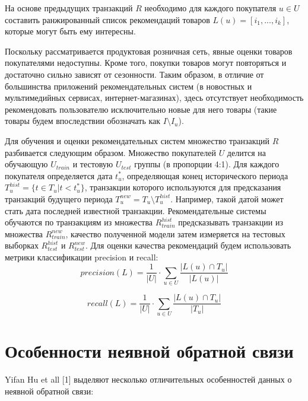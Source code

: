 \documentclass{article}
\begin{document}
На основе предыдущих транзакций $R$ необходимо для каждого покупателя $u \in U$ составить ранжированный список рекомендаций товаров $L(u) = [i_1, ..., i_k]$, которые могут быть ему интересны. \par
Поскольку рассматривается продуктовая розничная сеть, явные оценки товаров покупателями недоступны.
Кроме того, покупки товаров могут повторяться и достаточно сильно зависят от сезонности. Таким образом, в отличие от большинства приложений рекомендательных систем (в новостных и мультимедийных сервисах, интернет-магазинах), здесь отсутствует необходимость рекомендовать пользователю исключительно новые для него товары (такие товары будем впоследствии обозначать как $I \setminus I_u $).  \par
Для обучения и оценки рекомендательных систем множество транзакций $R$ разбивается следующим образом. Множество покупателей $U$ делится на обучающую $U_{train}$ и тестовую $U_{test}$ группы  (в пропорции 4:1). Для каждого покупателя определяется дата $t_u^*$, определяющая конец исторического периода $T_u^{hist} = \{t \in T_u | t < t_u^*\}$, транзакции которого используются для предсказания транзакций будущего периода $T_u^{new} = T_u \setminus T_u^{hist}$. Например, такой датой может стать дата последней известной транзакции. Рекомендательные системы обучаются по транзакциям из множества $R_{train}^{hist}$ предсказывать транзакции из множества $R_{train}^{new}$, качество полученной модели затем измеряется на тестовых выборках $R_{test}^{hist}$ и $R_{test}^{new}$.
Для оценки качества рекомендаций будем использовать метрики классификации precision и recall:
\begin{equation}
precision(L) = \frac{1}{|U|} \cdot \sum_{u \in U} \frac{|L(u) \cap T_u|}{|L(u)|}
\end{equation}

\begin{equation}
recall(L) = \frac{1}{|U|} \cdot \sum_{u \in U} \frac{|L(u) \cap T_u|}{|T_u|}
\end{equation}

\section{Особенности неявной обратной связи}
Yifan Hu et all [1] выделяют несколько отличительных особенностей данных о неявной обратной связи:
\end{document}

